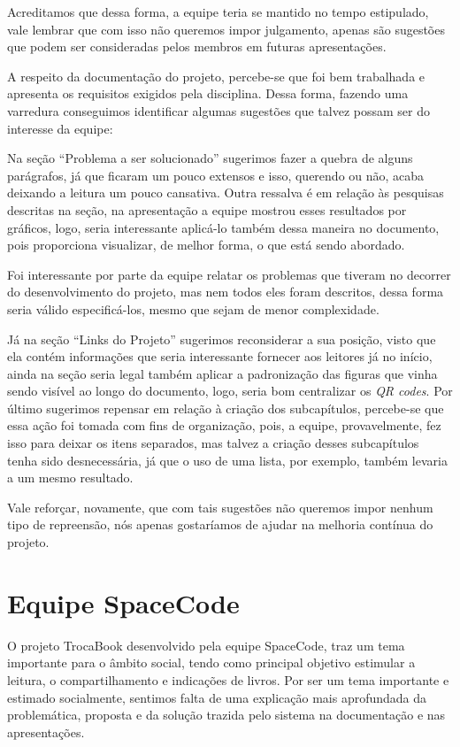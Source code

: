 Acreditamos que dessa forma, a equipe teria se mantido no tempo estipulado, vale lembrar que com isso não queremos impor julgamento, apenas são sugestões que podem ser consideradas pelos membros em futuras apresentações.

A respeito da documentação do projeto, percebe-se que foi bem trabalhada e apresenta os requisitos exigidos pela disciplina. Dessa forma, fazendo uma varredura conseguimos identificar algumas sugestões que talvez possam ser do interesse da equipe:

Na seção ``Problema a ser solucionado'' sugerimos fazer a quebra de alguns parágrafos, já que ficaram um pouco extensos e isso, querendo ou não, acaba deixando a leitura um pouco cansativa. Outra ressalva é em relação às pesquisas descritas na seção, na apresentação a equipe mostrou esses resultados por gráficos, logo, seria interessante aplicá-lo também dessa maneira no documento, pois proporciona visualizar, de melhor forma, o que está sendo abordado.

Foi interessante por parte da equipe relatar os problemas que tiveram no decorrer do desenvolvimento do projeto, mas nem todos eles foram descritos, dessa forma seria válido especificá-los, mesmo que sejam de menor complexidade.

Já na seção ``Links do Projeto'' sugerimos reconsiderar a sua posição, visto que ela contém informações que seria interessante fornecer aos leitores já no início, ainda na seção seria legal também aplicar a padronização das figuras que vinha sendo visível ao longo do documento, logo, seria bom centralizar os \textit{QR codes}. Por último sugerimos repensar em relação à criação dos subcapítulos, percebe-se que essa ação foi tomada com fins de organização, pois, a equipe, provavelmente, fez isso para deixar os itens separados, mas talvez a criação desses subcapítulos tenha sido desnecessária, já que o uso de uma lista, por exemplo, também levaria a um mesmo resultado.

Vale reforçar, novamente, que com tais sugestões não queremos impor nenhum tipo de repreensão, nós apenas gostaríamos de ajudar na melhoria contínua do projeto.

\section{Equipe SpaceCode}
O projeto TrocaBook desenvolvido pela equipe SpaceCode, traz um tema importante para o âmbito social, tendo como principal objetivo estimular a leitura, o compartilhamento e indicações de livros. Por ser um tema importante e estimado socialmente, sentimos falta de uma explicação mais aprofundada da problemática, proposta e da solução trazida pelo sistema na documentação e nas apresentações. 

